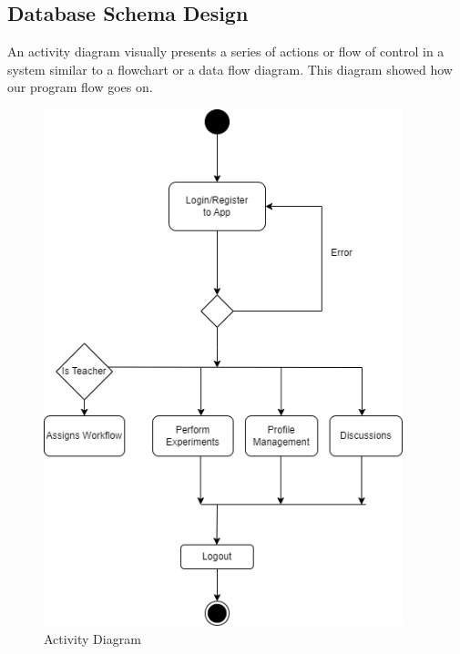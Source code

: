 \subsection{Database Schema Design}
An activity diagram visually presents a series of actions or flow of control in a system similar to a flowchart or a data flow diagram. This diagram showed how our program flow goes on.
\begin{figure}[H]
   \centering
    \includegraphics[height = 15cm]{Diagrams/Activity.drawio.png}
    \caption{Activity Diagram}
\end{figure}
\newpage

